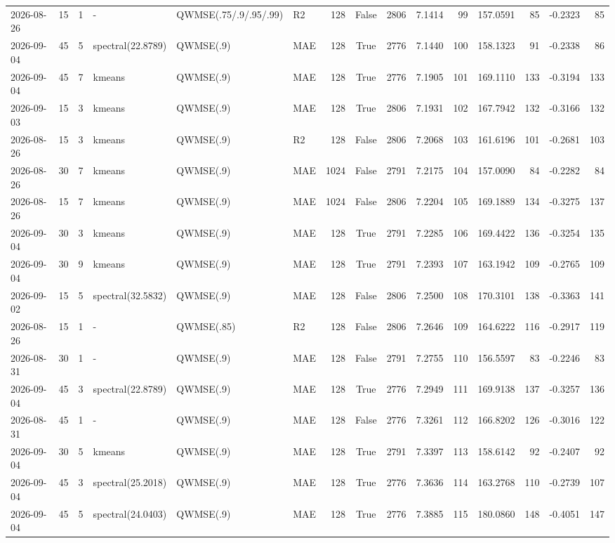 \documentclass[10pt]{article}
\begin{document}
\begin{landscape}
\begin{longtable}{@{}lrrlllrcrrrrrrr@{}}
2026-08-26 & 15 & 1 & - & QWMSE(.75/.9/.95/.99) & R2 & 128 & False & 2806 & 7.1414 & 99 & 157.0591 & 85 & -0.2323 & 85 \\
2026-09-04 & 45 & 5 & spectral(22.8789) & QWMSE(.9) & MAE & 128 & True & 2776 & 7.1440 & 100 & 158.1323 & 91 & -0.2338 & 86 \\
2026-09-04 & 45 & 7 & kmeans & QWMSE(.9) & MAE & 128 & True & 2776 & 7.1905 & 101 & 169.1110 & 133 & -0.3194 & 133 \\
2026-09-03 & 15 & 3 & kmeans & QWMSE(.9) & MAE & 128 & True & 2806 & 7.1931 & 102 & 167.7942 & 132 & -0.3166 & 132 \\
2026-08-26 & 15 & 3 & kmeans & QWMSE(.9) & R2 & 128 & False & 2806 & 7.2068 & 103 & 161.6196 & 101 & -0.2681 & 103 \\
2026-08-26 & 30 & 7 & kmeans & QWMSE(.9) & MAE & 1024 & False & 2791 & 7.2175 & 104 & 157.0090 & 84 & -0.2282 & 84 \\
2026-08-26 & 15 & 7 & kmeans & QWMSE(.9) & MAE & 1024 & False & 2806 & 7.2204 & 105 & 169.1889 & 134 & -0.3275 & 137 \\
2026-09-04 & 30 & 3 & kmeans & QWMSE(.9) & MAE & 128 & True & 2791 & 7.2285 & 106 & 169.4422 & 136 & -0.3254 & 135 \\
2026-09-04 & 30 & 9 & kmeans & QWMSE(.9) & MAE & 128 & True & 2791 & 7.2393 & 107 & 163.1942 & 109 & -0.2765 & 109 \\
2026-09-02 & 15 & 5 & spectral(32.5832) & QWMSE(.9) & MAE & 128 & False & 2806 & 7.2500 & 108 & 170.3101 & 138 & -0.3363 & 141 \\
2026-08-26 & 15 & 1 & - & QWMSE(.85) & R2 & 128 & False & 2806 & 7.2646 & 109 & 164.6222 & 116 & -0.2917 & 119 \\
2026-08-31 & 30 & 1 & - & QWMSE(.9) & MAE & 128 & False & 2791 & 7.2755 & 110 & 156.5597 & 83 & -0.2246 & 83 \\
2026-09-04 & 45 & 3 & spectral(22.8789) & QWMSE(.9) & MAE & 128 & True & 2776 & 7.2949 & 111 & 169.9138 & 137 & -0.3257 & 136 \\
2026-08-31 & 45 & 1 & - & QWMSE(.9) & MAE & 128 & False & 2776 & 7.3261 & 112 & 166.8202 & 126 & -0.3016 & 122 \\
2026-09-04 & 30 & 5 & kmeans & QWMSE(.9) & MAE & 128 & True & 2791 & 7.3397 & 113 & 158.6142 & 92 & -0.2407 & 92 \\
2026-09-04 & 45 & 3 & spectral(25.2018) & QWMSE(.9) & MAE & 128 & True & 2776 & 7.3636 & 114 & 163.2768 & 110 & -0.2739 & 107 \\
2026-09-04 & 45 & 5 & spectral(24.0403) & QWMSE(.9) & MAE & 128 & True & 2776 & 7.3885 & 115 & 180.0860 & 148 & -0.4051 & 147 \\

\end{longtable}
\end{landscape}
\end{document}
